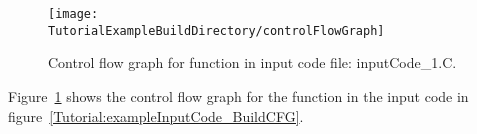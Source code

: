\begin{figure}
\texttt{[image: \\TutorialExampleBuildDirectory/controlFlowGraph]}
\caption{Control flow graph for function in input code file: inputCode\_1.C.}
\label{Tutorial:exampleBuildCFGGraph}
\end{figure}

   Figure~\ref{Tutorial:exampleBuildCFGGraph} shows the control flow graph for the
function in the input code in figure~\ref{Tutorial:exampleInputCode_BuildCFG}.



